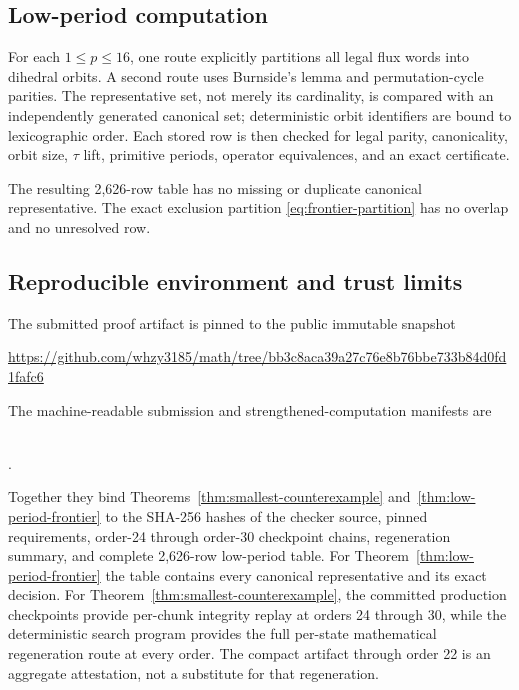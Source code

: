 \subsection{Low-period computation}

For each \(1\leq p\leq 16\), one route explicitly partitions all legal flux words into
dihedral orbits. A second route uses Burnside's lemma and permutation-cycle
parities. The representative set, not merely its cardinality, is compared with
an independently generated canonical set; deterministic orbit identifiers are
bound to lexicographic order. Each stored row is then checked for legal parity,
canonicality, orbit size, \(\tau\) lift, primitive periods, operator equivalences,
and an exact certificate.

The resulting 2,626-row table has no missing or duplicate canonical
representative. The exact exclusion partition \eqref{eq:frontier-partition} has no overlap and no
unresolved row.

\subsection{Reproducible environment and trust limits}

The submitted proof artifact is pinned to the public immutable snapshot

\begin{center}
\url{https://github.com/whzy3185/math/tree/bb3c8aca39a27c76e8b76bbe733b84d0fd1fafc6}
\end{center}

The machine-readable submission and strengthened-computation manifests are

\begin{center}
\small
{}\\
.
\end{center}

Together they bind
Theorems~\ref{thm:smallest-counterexample} and~\ref{thm:low-period-frontier} to the SHA-256 hashes of the checker source, pinned
requirements, order-24 through order-30 checkpoint chains, regeneration
summary, and complete 2,626-row low-period table. For Theorem~\ref{thm:low-period-frontier} the table
contains every canonical representative and its exact decision. For Theorem~\ref{thm:smallest-counterexample},
the committed production checkpoints provide per-chunk integrity replay at
orders 24 through 30, while the deterministic search program provides the
full per-state mathematical regeneration route at every order. The compact
artifact through order 22 is an aggregate attestation, not a substitute for
that regeneration.

